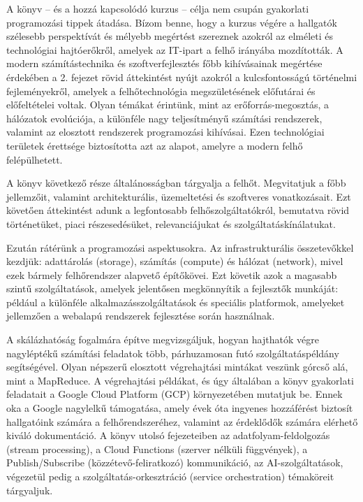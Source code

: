 \documentclass[
]{article}
\begin{document}
A könyv -- és a hozzá kapcsolódó kurzus -- célja nem csupán gyakorlati
programozási tippek átadása. Bízom benne, hogy a kurzus végére a
hallgatók szélesebb perspektívát és mélyebb megértést szereznek azokról
az elméleti és technológiai hajtóerőkről, amelyek az IT-ipart a felhő
irányába mozdították. A modern számítástechnika és szoftverfejlesztés
főbb kihívásainak megértése érdekében a 2. fejezet rövid áttekintést
nyújt azokról a kulcsfontosságú történelmi fejleményekről, amelyek a
felhőtechnológia megszületésének előfutárai és előfeltételei voltak.
Olyan témákat érintünk, mint az erőforrás-megosztás, a hálózatok
evolúciója, a különféle nagy teljesítményű számítási rendszerek,
valamint az elosztott rendszerek programozási kihívásai. Ezen
technológiai területek érettsége biztosította azt az alapot, amelyre a
modern felhő felépülhetett.

A könyv következő része általánosságban tárgyalja a felhőt. Megvitatjuk
a főbb jellemzőit, valamint architekturális, üzemeltetési és szoftveres
vonatkozásait. Ezt követően áttekintést adunk a legfontosabb
felhőszolgáltatókról, bemutatva rövid történetüket, piaci
részesedésüket, relevanciájukat és szolgáltatáskínálatukat.

Ezután rátérünk a programozási aspektusokra. Az infrastrukturális
összetevőkkel kezdjük: adattárolás (storage), számítás (compute) és
hálózat (network), mivel ezek bármely felhőrendszer alapvető építőkövei.
Ezt követik azok a magasabb szintű szolgáltatások, amelyek jelentősen
megkönnyítik a fejlesztők munkáját: például a különféle
alkalmazásszolgáltatások és speciális platformok, amelyeket jellemzően a
webalapú rendszerek fejlesztése során használnak.

A skálázhatóság fogalmára építve megvizsgáljuk, hogyan hajthatók végre
nagyléptékű számítási feladatok több, párhuzamosan futó
szolgáltatáspéldány segítségével. Olyan népszerű elosztott végrehajtási
mintákat veszünk górcső alá, mint a MapReduce. A végrehajtási példákat,
és úgy általában a könyv gyakorlati feladatait a Google Cloud Platform
(GCP) környezetében mutatjuk be. Ennek oka a Google nagylelkű
támogatása, amely évek óta ingyenes hozzáférést biztosít hallgatóink
számára a felhőrendszeréhez, valamint az érdeklődők számára elérhető
kiváló dokumentáció. A könyv utolsó fejezeteiben az
adatfolyam-feldolgozás (stream processing), a Cloud Functions (szerver
nélküli függvények), a Publish/Subscribe (közzétevő-feliratkozó)
kommunikáció, az AI-szolgáltatások, végezetül pedig a
szolgáltatás-orkesztráció (service orchestration) témaköreit tárgyaljuk.
\end{document}
